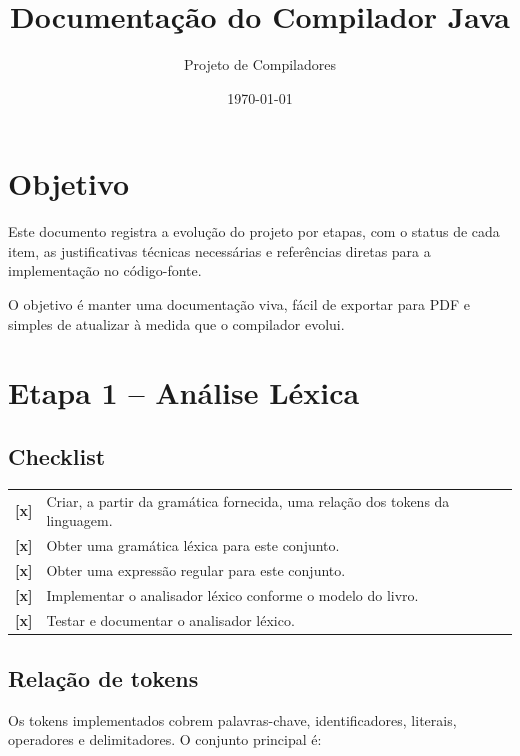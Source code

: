 \documentclass[12pt,a4paper]{article}
\title{Documentação do Compilador Java}
\author{Projeto de Compiladores}
\date{\today}
\newcommand{\checked}{\textbf{[x]}}
\begin{document}
\maketitle

\tableofcontents
\newpage

\section{Objetivo}

Este documento registra a evolução do projeto por etapas, com o status de cada item, as justificativas técnicas necessárias e referências diretas para a implementação no código-fonte.

O objetivo é manter uma documentação viva, fácil de exportar para PDF e simples de atualizar à medida que o compilador evolui.

\section{Etapa 1 -- Análise Léxica}

\subsection*{Checklist}

\begin{longtable}{>{\raggedright\arraybackslash}p{} p{}}
\checked & Criar, a partir da gramática fornecida, uma relação dos tokens da linguagem. \\
\checked & Obter uma gramática léxica para este conjunto. \\
\checked & Obter uma expressão regular para este conjunto. \\
\checked & Implementar o analisador léxico conforme o modelo do livro. \\
\checked & Testar e documentar o analisador léxico. \\
\end{longtable}

\subsection*{Relação de tokens}

Os tokens implementados cobrem palavras-chave, identificadores, literais, operadores e delimitadores. O conjunto principal é:
\end{document}
